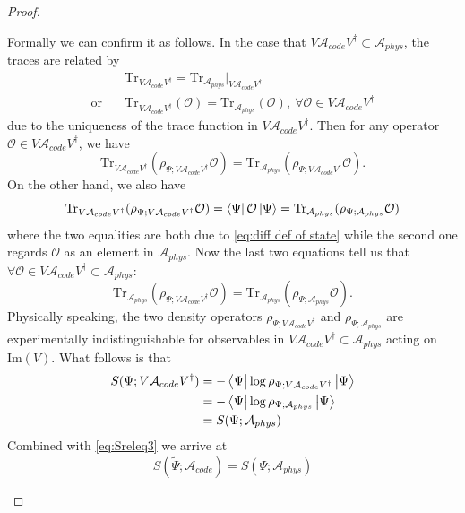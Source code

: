 \documentclass[a4paper,11pt]{article}
\newcommand{\diracprod}[3]{\left\langle  #1 \vphantom{#2#3} \right|#2 \left| #3 \vphantom{#1#2} \right\rangle } %
\renewcommand{\=}[1]{\stackrel{#1}{=}} %
\newcommand{\im}{\text{Im}}
\def\A{\mathcal{A}}
\def\O{\mathcal{O}}
\def\Tr{\text{Tr}}
\begin{document}
\begin{proof}
\begin{itemize}
		
		Formally we can confirm it as follows. In the case that $V\A_{code} V^\dagger \subset\A_{phys}$, the traces are related by
		\begin{equation}
			\begin{aligned}
				&\Tr_{V\A_{code}V^\dagger}=\Tr_{\A_{phys}}\big|_{V\A_{code}V^\dagger}\\
				\text{or}\quad &\Tr_{V\A_{code}V^\dagger}(\O)=\Tr_{\A_{phys}}(\O),~\forall \O\in V\A_{code}V^\dagger
			\end{aligned}
		\end{equation}
		due to the uniqueness of the trace function in $V\A_{code} V^\dagger$. Then for any operator $\O\in V\A_{code} V^\dagger $, we have
		\begin{equation}
			\Tr_{V\A_{code}V^\dagger}(\rho_{\Psi;V\A_{code} V^\dagger}\O)=\Tr_{\A_{phys}}(\rho_{\Psi;V\A_{code} V^\dagger}\O).
		\end{equation}
		On the other hand, we also have
		\begin{equation}
			\Tr_{V\A_{code}V^\dagger}(\rho_{\Psi;V\A_{code} V^\dagger}\O)=\diracprod{\Psi}{\O}{\Psi}=\Tr_{\A_{phys}}(\rho_{\Psi;\A_{phys}}\O)
		\end{equation}
		where the two equalities are both due to \eqref{eq:diff def of state} while the second one regards $\O$ as an element in $\A_{phys}$. Now the last two equations tell us that $\forall\O\in V\A_{code} V^\dagger\subset\A_{phys}$:
		\begin{equation}
			\Tr_{\A_{phys}}(\rho_{\Psi;V\A_{code} V^\dagger}\O)=\Tr_{\A_{phys}}(\rho_{\Psi;\A_{phys}}\O).
		\end{equation}
		Physically speaking, the two density operators $\rho_{\Psi;V\A_{code} V^\dagger}$ and $\rho_{\Psi;\A_{phys}}$ are experimentally indistinguishable for observables in $V\A_{code} V^\dagger\subset\A_{phys}$ acting on $\im(V)$. What follows is that
		\begin{equation}
			\begin{aligned}
				S(\Psi;V\A_{code} V^\dagger)&=-\diracprod{\Psi}{\log \rho_{\Psi;V\A_{code} V^\dagger}}{\Psi}\\
				&=-\diracprod{\Psi}{\log \rho_{\Psi;\A_{phys}}}{\Psi}\\
				&=S(\Psi;\A_{phys})
			\end{aligned}
		\end{equation}
		Combined with \eqref{eq:Sreleq3} we arrive at
		\begin{equation}
			S(\widetilde{\Psi};\A_{code})=S(\Psi;\A_{phys})
		\end{equation}
		

\end{itemize}
\end{proof}
\end{document}
